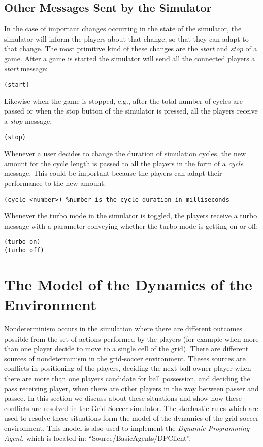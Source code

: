 \documentclass[12pt,titlepage,a4paper]{article}
\begin{document}
\subsection{Other Messages Sent by the Simulator}

In the case of important changes occurring in the state of the simulator, the simulator will inform the players about that change, so that they can adapt to that change. The most primitive kind of these changes are the \emph{start} and \emph{stop} of a game. After a game is started the simulator will send all the connected players a \emph{start} message:

\begin{verbatim}
(start)
\end{verbatim}

Likewise when the game is stopped, e.g., after the total number of cycles are passed or when the stop button of the simulator is pressed, all the players receive a \emph{stop} message:

\begin{verbatim}
(stop)
\end{verbatim}

Whenever a user decides to change the duration of simulation cycles, the new amount for the cycle length is passed to all the players in the form of a \emph{cycle} message. This could be important because the players can adapt their performance to the new amount:

\begin{verbatim}
(cycle <number>) %number is the cycle duration in milliseconds
\end{verbatim}

Whenever the turbo mode in the simulator is toggled, the players receive a turbo message with a parameter conveying whether the turbo mode is getting on or off:

\begin{verbatim}
(turbo on)
(turbo off)
\end{verbatim}


\section{The Model of the Dynamics of the Environment}

Nondeterminism occurs in the simulation where there are different outcomes possible from the set of actions performed by the players (for example when more than one player decide to move to a single cell of the grid). There are different sources of nondeterminism in the grid-soccer environment. Theses sources are conflicts in positioning of the players, deciding the next ball owner player when there are more than one players candidate for ball possession, and deciding the pass receiving player, when there are other players in the way between passer and passee. In this section we discuss about these situations and show how these conflicts are resolved in the Grid-Soccer simulator. The stochastic rules which are used to resolve these situations form the model of the dynamics of the grid-soccer environment. This model is also used to implement the \emph{Dynamic-Programming Agent}, which is located in: ``Source/BasicAgents/DPClient''.
\end{document}
